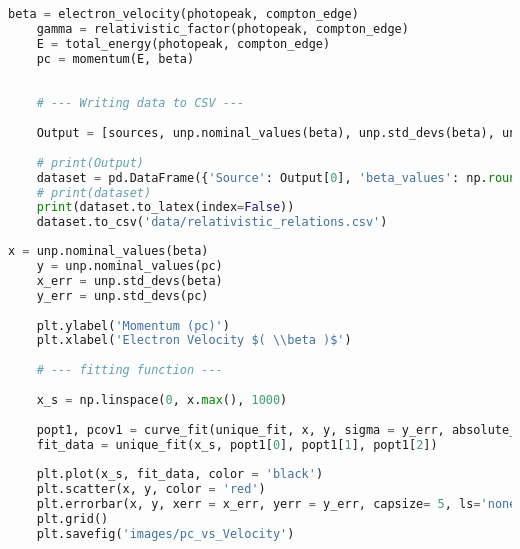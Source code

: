 \begin{lstlisting}[language = Python, frame = single]
    beta = electron_velocity(photopeak, compton_edge)
    gamma = relativistic_factor(photopeak, compton_edge)
    E = total_energy(photopeak, compton_edge)
    pc = momentum(E, beta)
    
    
    # --- Writing data to CSV --- 
    
    Output = [sources, unp.nominal_values(beta), unp.std_devs(beta), unp.nominal_values(gamma), unp.std_devs(gamma), unp.nominal_values(clre), unp.std_devs(clre), unp.nominal_values(relre), unp.std_devs(relre), unp.nominal_values(E), unp.std_devs(E)]
    
    # print(Output)
    dataset = pd.DataFrame({'Source': Output[0], 'beta_values': np.round(Output[1], 3), 'beta_uncertainties': np.round(Output[2], 3), 'Gamma_values': np.round(Output[3], 3), 'Gamma_uncertainties': np.round(Output[4], 3), 'Classical_Rest_Energy_MeV': np.round(Output[5], 3), 'Classical_Rest_Energy_uncertainties_MeV': np.round(Output[6], 3), 'Relativistic_Rest_Energy_MeV': np.round(Output[7], 3), 'Relativistic_Rest_Energy_uncertainties_MeV': np.round(Output[8] , 3), 'Total_Energy': np.round(Output[9], 3), 'Total_Energy_Uncer': np.round(Output[10], 3)})
    # print(dataset)
    print(dataset.to_latex(index=False))
    dataset.to_csv('data/relativistic_relations.csv')
\end{lstlisting}

\begin{lstlisting}[language = Python, frame = single]
    x = unp.nominal_values(beta)
    y = unp.nominal_values(pc)
    x_err = unp.std_devs(beta)
    y_err = unp.std_devs(pc)
    
    plt.ylabel('Momentum (pc)')
    plt.xlabel('Electron Velocity $( \\beta )$')
    
    # --- fitting function --- 
    
    x_s = np.linspace(0, x.max(), 1000)
    
    popt1, pcov1 = curve_fit(unique_fit, x, y, sigma = y_err, absolute_sigma = True, p0 = [.1, 3, 1])
    fit_data = unique_fit(x_s, popt1[0], popt1[1], popt1[2])
    
    plt.plot(x_s, fit_data, color = 'black')
    plt.scatter(x, y, color = 'red')
    plt.errorbar(x, y, xerr = x_err, yerr = y_err, capsize= 5, ls='none', color = 'red')
    plt.grid()
    plt.savefig('images/pc_vs_Velocity')
\end{lstlisting}

